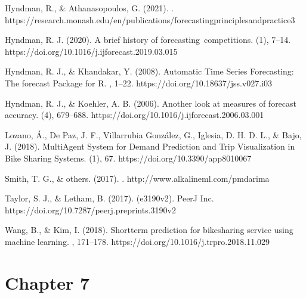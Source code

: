\documentclass[letterpaper,10pt,english]{jupyterBook}
\begin{document}
\sphinxAtStartPar
Hyndman, R., \& Athanasopoulos, G. (2021). . https://research.monash.edu/en/publications/forecasting\sphinxhyphen{}principles\sphinxhyphen{}and\sphinxhyphen{}practice\sphinxhyphen{}3

\sphinxAtStartPar
Hyndman, R. J. (2020). A brief history of forecasting competitions. (1), 7–14. https://doi.org/10.1016/j.ijforecast.2019.03.015

\sphinxAtStartPar
Hyndman, R. J., \& Khandakar, Y. (2008). Automatic Time Series Forecasting: The forecast Package for R. , 1–22. https://doi.org/10.18637/jss.v027.i03

\sphinxAtStartPar
Hyndman, R. J., \& Koehler, A. B. (2006). Another look at measures of forecast accuracy. (4), 679–688. https://doi.org/10.1016/j.ijforecast.2006.03.001

\sphinxAtStartPar
Lozano, Á., De Paz, J. F., Villarrubia González, G., Iglesia, D. H. D. L., \& Bajo, J. (2018). Multi\sphinxhyphen{}Agent System for Demand Prediction and Trip Visualization in Bike Sharing Systems. (1), 67. https://doi.org/10.3390/app8010067

\sphinxAtStartPar
Smith, T. G., \& others. (2017). . http://www.alkaline\sphinxhyphen{}ml.com/pmdarima

\sphinxAtStartPar
Taylor, S. J., \& Letham, B. (2017).  (e3190v2). PeerJ Inc. https://doi.org/10.7287/peerj.preprints.3190v2

\sphinxAtStartPar
Wang, B., \& Kim, I. (2018). Short\sphinxhyphen{}term prediction for bike\sphinxhyphen{}sharing service using machine learning. , 171–178. https://doi.org/10.1016/j.trpro.2018.11.029


\section{Chapter 7}
\label{\detokenize{references:chapter-7}}






\renewcommand{\indexname}{Index}
\printindex
\end{document}
